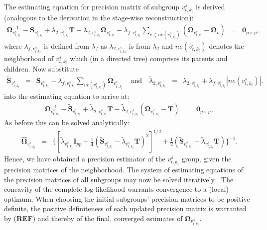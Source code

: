 \documentclass[10pt]{article}
\begin{document}
The estimating equation for precision matrix of subgroup $v_{t, k_t}^s$ is derived (analogous to the derivation in the stage-wise reconstruction):
\begin{eqnarray*}
\mathbf{\Omega}_{v_{t, k_t}^s}^{-1} - \mathbf{S}_{v_{t, k_t}^s} + \lambda_{2, v_{t, k_t}^s} \mathbf{T} - \lambda_{2, v_{t, k_t}^s} \mathbf{\Omega}_{v_{t, k_t}^s} - \lambda_{f, v_{t, k_t}^s} \sum_{v \in ne(v_{t, k_t}^s) } (\mathbf{\Omega}_{v_{t, k_t}^s} -\mathbf{\Omega}_{v}) & = & \mathbf{0}_{p \times p},
\end{eqnarray*}
where $\lambda_{f, v_{t, k_t}^s}$ is defined from $\lambda_f$ as $\lambda_{2, v_{t, k_t}^s}$ is from $\lambda_2$ and $ne(v_{t, k_t}^s)$ denotes the neighborhood of $v_{t, k_t}^s$ which (in a directed tree) comprises its parents and children. Now substitute
\begin{eqnarray*}
\tilde{\mathbf{S}}_{v_{t,k_t}^s} \, \, \, = \, \, \, \mathbf{S}_{v_{t,k_t}^s} - \lambda_{f, v_{t, k_t}^s} \sum_{ne(v_{t, k_t}^s)} \mathbf{\Omega}_{v_{t^{\prime},k_{t^{\prime}}}^s} \quad \mbox{and} \quad \tilde{\lambda}_{2, v_{t,k_{t}}^s} \, \, \, = \, \, \, \lambda_{2, v_{t,k_{t}}^s}  + \lambda_{f, v_{t,k_{t}}^s} | ne(v_{t,k_{t}}^s) |.
\end{eqnarray*}
into the estimating equation to arrive at:
\begin{eqnarray*}
\mathbf{\Omega}_{v_{t, k_t}^s}^{-1} - \tilde{\mathbf{S}}_{v_{t, k_t}^s} + \tilde{\lambda}_{2, v_{t, k_t}^s} \mathbf{T} - \tilde{\lambda}_{2, v_{t, k_t}^s}(\mathbf{\Omega}_{v_{t, k_t}^s} -\mathbf{T}) & = & \mathbf{0}_{p \times p},
\end{eqnarray*}
As before this can be solved analytically:
\begin{eqnarray}
\widehat{\mathbf{\Omega}}_{v_{t,k_{t}}^s} & = & \big\{[\tilde{\lambda}_{v_{t,k_{t}}^s} \mathbf{I}_{pp} + \tfrac{1}{4}(\tilde{\mathbf{S}}_{v_{t,k_{t}}^s}-\tilde{\lambda}_{v_{t,k_{t}}^s} \mathbf{T})^2]^{1/2} + \tfrac{1}{2} (\tilde{\mathbf{S}}_{v_{t,k_{t}}^s} - \tilde{\lambda}_{v_{t,k_{t}}^s}\mathbf{T}) \big\}^{-1}. \label{eq:thetahat}
\end{eqnarray}
Hence, we have obtained a precision estimator of the $v_{t,k_{t}}^s$ group, given the precision matrices of the neighborhood. The system of estimating equations of the precision matrices of all subgroups may now be solved iteratively \citep{Bilg2015}. The concavity of the complete log-likelihood warrants convergence to a (local) optimum. When choosing the initial subgroups' precision matrices to be positive definite, the positive definiteness of each updated precision matrix is warranted by (\textbf{REF}) and thereby of the final, converged estimates of $\mathbf{\Omega}_{v_{t,k_{t}}^s}$.
\end{document}
